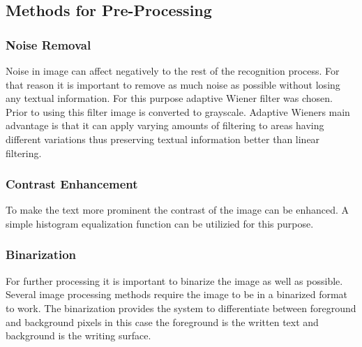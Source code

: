 \documentclass{article}
\begin{document}
    \subsection{Methods for Pre-Processing}

        \subsubsection{Noise Removal}
          Noise in image can affect negatively to the rest of the recognition process. For that reason it is important to remove as much noise as possible without losing any textual information. For this purpose adaptive Wiener filter was chosen. Prior to using this filter image is converted to grayscale. Adaptive Wieners main advantage is that it can apply varying amounts of filtering to areas having different variations thus preserving textual information better than linear filtering.\cite{TheMathWorksWiener}

        \subsubsection{Contrast Enhancement}
          To make the text more prominent the contrast of the image can be enhanced. A simple histogram equalization function can be utilizied for this purpose.

        \subsubsection{Binarization}
          For further processing it is important to binarize the image as well as possible. Several image processing methods require the image to be in a binarized format to work. The binarization provides the system to differentiate between foreground and background pixels in this case the foreground is the written text and background is the writing surface.
\end{document}
